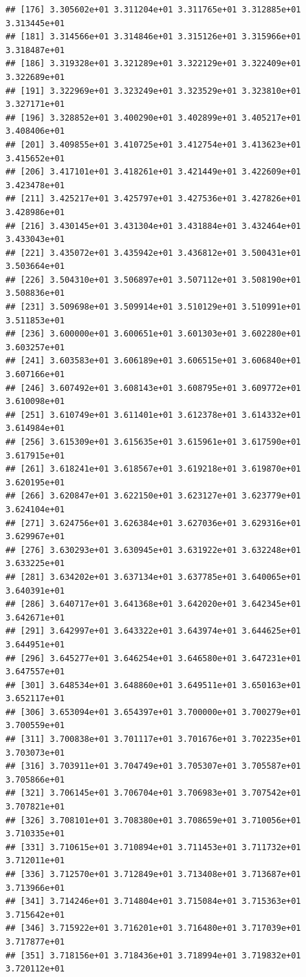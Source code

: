 \documentclass[]{book}
\theoremstyle{definition}
\theoremstyle{definition}
\theoremstyle{definition}
\theoremstyle{remark}
\begin{document}
\begin{verbatim}
## [176] 3.305602e+01 3.311204e+01 3.311765e+01 3.312885e+01 3.313445e+01
## [181] 3.314566e+01 3.314846e+01 3.315126e+01 3.315966e+01 3.318487e+01
## [186] 3.319328e+01 3.321289e+01 3.322129e+01 3.322409e+01 3.322689e+01
## [191] 3.322969e+01 3.323249e+01 3.323529e+01 3.323810e+01 3.327171e+01
## [196] 3.328852e+01 3.400290e+01 3.402899e+01 3.405217e+01 3.408406e+01
## [201] 3.409855e+01 3.410725e+01 3.412754e+01 3.413623e+01 3.415652e+01
## [206] 3.417101e+01 3.418261e+01 3.421449e+01 3.422609e+01 3.423478e+01
## [211] 3.425217e+01 3.425797e+01 3.427536e+01 3.427826e+01 3.428986e+01
## [216] 3.430145e+01 3.431304e+01 3.431884e+01 3.432464e+01 3.433043e+01
## [221] 3.435072e+01 3.435942e+01 3.436812e+01 3.500431e+01 3.503664e+01
## [226] 3.504310e+01 3.506897e+01 3.507112e+01 3.508190e+01 3.508836e+01
## [231] 3.509698e+01 3.509914e+01 3.510129e+01 3.510991e+01 3.511853e+01
## [236] 3.600000e+01 3.600651e+01 3.601303e+01 3.602280e+01 3.603257e+01
## [241] 3.603583e+01 3.606189e+01 3.606515e+01 3.606840e+01 3.607166e+01
## [246] 3.607492e+01 3.608143e+01 3.608795e+01 3.609772e+01 3.610098e+01
## [251] 3.610749e+01 3.611401e+01 3.612378e+01 3.614332e+01 3.614984e+01
## [256] 3.615309e+01 3.615635e+01 3.615961e+01 3.617590e+01 3.617915e+01
## [261] 3.618241e+01 3.618567e+01 3.619218e+01 3.619870e+01 3.620195e+01
## [266] 3.620847e+01 3.622150e+01 3.623127e+01 3.623779e+01 3.624104e+01
## [271] 3.624756e+01 3.626384e+01 3.627036e+01 3.629316e+01 3.629967e+01
## [276] 3.630293e+01 3.630945e+01 3.631922e+01 3.632248e+01 3.633225e+01
## [281] 3.634202e+01 3.637134e+01 3.637785e+01 3.640065e+01 3.640391e+01
## [286] 3.640717e+01 3.641368e+01 3.642020e+01 3.642345e+01 3.642671e+01
## [291] 3.642997e+01 3.643322e+01 3.643974e+01 3.644625e+01 3.644951e+01
## [296] 3.645277e+01 3.646254e+01 3.646580e+01 3.647231e+01 3.647557e+01
## [301] 3.648534e+01 3.648860e+01 3.649511e+01 3.650163e+01 3.652117e+01
## [306] 3.653094e+01 3.654397e+01 3.700000e+01 3.700279e+01 3.700559e+01
## [311] 3.700838e+01 3.701117e+01 3.701676e+01 3.702235e+01 3.703073e+01
## [316] 3.703911e+01 3.704749e+01 3.705307e+01 3.705587e+01 3.705866e+01
## [321] 3.706145e+01 3.706704e+01 3.706983e+01 3.707542e+01 3.707821e+01
## [326] 3.708101e+01 3.708380e+01 3.708659e+01 3.710056e+01 3.710335e+01
## [331] 3.710615e+01 3.710894e+01 3.711453e+01 3.711732e+01 3.712011e+01
## [336] 3.712570e+01 3.712849e+01 3.713408e+01 3.713687e+01 3.713966e+01
## [341] 3.714246e+01 3.714804e+01 3.715084e+01 3.715363e+01 3.715642e+01
## [346] 3.715922e+01 3.716201e+01 3.716480e+01 3.717039e+01 3.717877e+01
## [351] 3.718156e+01 3.718436e+01 3.718994e+01 3.719832e+01 3.720112e+01

\end{verbatim}
\end{document}
